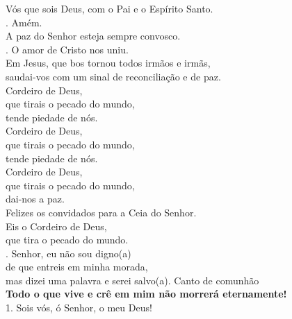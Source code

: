 \documentclass{book}
\begin{document}
\begin{flushleft}
    Vós que sois Deus, com o Pai e o Espírito Santo.
    \vspace{.2cm} \\
    {\color{VioletRed2} \Rbar.} Amém.
    \vspace{.2cm} \\
    A paz do Senhor esteja sempre convosco.
    \vspace{.2cm} \\
    {\color{VioletRed2} \Rbar.} O amor de Cristo nos uniu.
    \vspace{.2cm} \\
    Em Jesus, que bos tornou todos irmãos e irmãs, \\
    saudai-vos com um sinal de reconciliação e de paz.
    \vspace{.2cm} \\
    Cordeiro de Deus, \\
    que tirais o pecado do mundo, \\
    tende piedade de nós. \\
    Cordeiro de Deus, \\
    que tirais o pecado do mundo, \\
    tende piedade de nós. \\
    Cordeiro de Deus, \\
    que tirais o pecado do mundo, \\
    dai-nos a paz.
    \vspace{.2cm} \\
    Felizes os convidados para a Ceia do Senhor.
    \vspace{.2cm} \\
    Eis o Cordeiro de Deus, \\
    que tira o pecado do mundo.
    \vspace{.2cm} \\
    {\color{VioletRed2} \Rbar.} Senhor, eu não sou digno{\color{VioletRed2}(}a{\color{VioletRed2})} \\
    de que entreis em minha morada, \\
    mas dizei uma palavra e serei salvo{\color{VioletRed2}(}a{\color{VioletRed2})}.
    \newpage
    \textcolor{VioletRed2}{Canto de comunhão}
    \vspace{.2cm} \\
    \textbf{Todo o que vive e crê em mim não morrerá eternamente!}
    \vspace{.2cm} \\
    1. Sois vós, ó Senhor, o meu Deus! \\

\end{flushleft}
\end{document}

